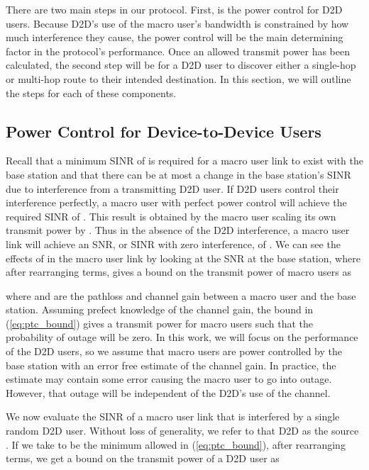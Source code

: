 \documentclass[10pt, final, journal, letterpaper,oneside, twocolumn]{IEEEtran}
\begin{document}
There are two main steps in our protocol.  First, is the power control for D2D users.  Because D2D's use of the macro user's bandwidth is constrained by how much interference they cause, the power control will be the main determining factor in the protocol's performance.  Once an allowed transmit power has been calculated, the second step will be for a D2D user to discover either a single-hop or multi-hop route to their intended destination.  In this section, we will outline the steps for each of these components.  

\subsection{Power Control for Device-to-Device Users}
\label{sec:power_control}

Recall that a minimum SINR of  is required for a macro user link to exist with the base station and that there can be at most a  change in the base station's SINR due to interference from a transmitting D2D user.  If D2D users control their interference perfectly, a macro user with perfect power control will achieve the required SINR of .  This result is obtained by the macro user scaling its own transmit power by .  Thus in the absence of the D2D interference, a macro user link will achieve an SNR, or SINR with zero interference, of .  We can see the effects of  in the macro user link by looking at the SNR at the base station, where after rearranging terms, gives a bound on the transmit power of macro users as

where  and  are the pathloss and channel gain between a macro user and the base station.  Assuming prefect knowledge of the channel gain, the bound in (\ref{eq:ptc_bound}) gives a transmit power for macro users such that the probability of outage will be zero.  In this work, we will focus on the performance of the D2D users, so we assume that macro users are power controlled by the base station with an error free estimate of the channel gain.  In practice, the estimate may contain some error causing the macro user to go into outage.  However, that outage will be independent of the D2D's use of the channel.  


We now evaluate the SINR of a macro user link that is interfered by a single random D2D user. Without loss of generality, we refer to that D2D as the source .  If we take  to be the minimum allowed in (\ref{eq:ptc_bound}), after rearranging terms, we get a bound on the transmit power of a D2D user as
\end{document}

